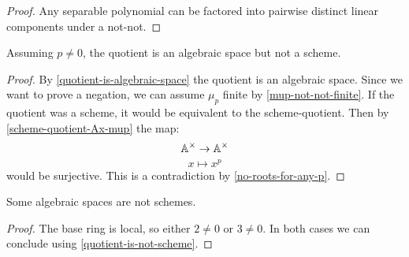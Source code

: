 \begin{proof}
Any separable polynomial can be factored into pairwise distinct linear components under a not-not.
\end{proof}

\begin{proposition}\label{quotient-is-not-scheme}
Assuming $p\not=0$, the quotient is an algebraic space but not a scheme.
\end{proposition}

\begin{proof}
By \cref{quotient-is-algebraic-space} the quotient is an algebraic space. Since we want to prove a negation, we can assume $\mu_p$ finite by \cref{mup-not-not-finite}. If the quotient was a scheme, it would be equivalent to the scheme-quotient. Then by \cref{scheme-quotient-Ax-mup} the map:
\[\mathbb{A}^\times\to\mathbb{A}^\times\]
\[x\mapsto x^p\]
would be surjective. This is a contradiction by \cref{no-roots-for-any-p}.
\end{proof}

\begin{corollary}
Some algebraic spaces are not schemes.
\end{corollary}

\begin{proof}
The base ring is local, so either $2\not=0$ or $3\not=0$. In both cases we can conclude using \cref{quotient-is-not-scheme}.
\end{proof}
